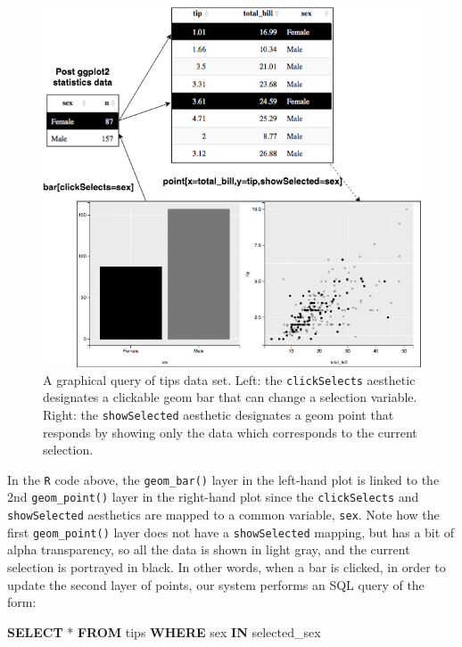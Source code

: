 \documentclass[12pt,]{article}
\newenvironment{Shaded}{\begin{snugshade}}{\end{snugshade}}
\newcommand{\KeywordTok}[1]{\textcolor[rgb]{0.13,0.29,0.53}{\textbf{#1}}}
\newcommand{\NormalTok}[1]{#1}
\theoremstyle{definition}
\theoremstyle{definition}
\theoremstyle{definition}
\theoremstyle{remark}
\begin{document}
\begin{figure}
\centering
\includegraphics{images/tips}
\caption{\label{fig:tips}A graphical query of tips data set. Left: the
\texttt{clickSelects} aesthetic designates a clickable geom bar that can
change a selection variable. Right: the \texttt{showSelected} aesthetic
designates a geom point that responds by showing only the data which
corresponds to the current selection.}
\end{figure}

In the \texttt{R} code above, the \texttt{geom\_bar()} layer in the
left-hand plot is linked to the 2nd \texttt{geom\_point()} layer in the
right-hand plot since the \texttt{clickSelects} and
\texttt{showSelected} aesthetics are mapped to a common variable,
\texttt{sex}. Note how the first \texttt{geom\_point()} layer does not
have a \texttt{showSelected} mapping, but has a bit of alpha
transparency, so all the data is shown in light gray, and the current
selection is portrayed in black. In other words, when a bar is clicked,
in order to update the second layer of points, our system performs an
SQL query of the form:

\begin{Shaded}
\begin{Highlighting}[]
\KeywordTok{SELECT}\NormalTok{ * }\KeywordTok{FROM}\NormalTok{ tips}
  \KeywordTok{WHERE}\NormalTok{ sex }\KeywordTok{IN}\NormalTok{ selected_sex}
\end{Highlighting}
\end{Shaded}
\end{document}

